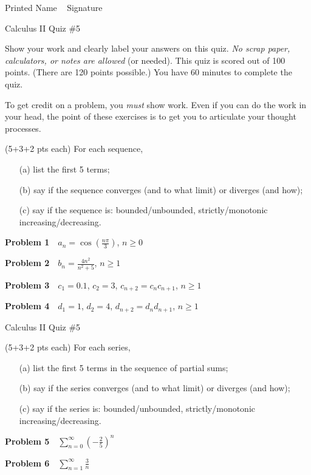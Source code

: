 \documentclass[10pt]{article}
\newcommand{\prob}[1]{\vspace{10mm} \noindent \textbf{Problem #1} \,\,}
\newcommand{\header}{
\begin{center}
Calculus II Quiz \#5
\end{center}

\vspace{2mm}

}
\newcommand{\namefield}{
\noindent Printed Name \underline{\hspace{50mm}} \,\,\, Signature \underline{\hspace{50mm}}
}
\newcommand{\inst}[2]{
Show your work and clearly label your answers on this quiz. \emph{No scrap paper, calculators, or notes are allowed} (or needed). This quiz is scored out of #1 points. (There are #2 points possible.) You have 60 minutes to complete the quiz.

To get credit on a problem, you \emph{must} show work. Even if you can do the work in your head, the point of these exercises is to get you to articulate your thought processes.
}
\begin{document}


\namefield

\header

\inst{100}{120}


(5+3+2 pts each) For each sequence, 
\begin{itemize}
\item[(a) ] list the first 5 terms;
\item[(b) ] say if the sequence converges (and to what limit) or diverges (and how);
\item[(c) ] say if the sequence is: bounded/unbounded, strictly/monotonic increasing/decreasing.
\end{itemize}

\prob{1} $a_n = \cos(\frac{n \pi}{3})$, $n \geq 0$

\vspace{30mm}

\prob{2} $b_n = \frac{4 n^2}{n^2 + 5}$, $n \geq 1$

\vspace{30mm}

\prob{3} $c_1 = 0.1$, $c_2 = 3$, $c_{n+2} = c_n c_{n+1}$, $n \geq 1$

\vspace{30mm}

\prob{4} $d_1 = 1$, $d_2 = 4$, $d_{n+2} = d_n d_{n+1}$, $n \geq 1$

\pagebreak

\header

(5+3+2 pts each) For each series, 
\begin{itemize}
\item[(a) ] list the first 5 terms in the sequence of partial sums;
\item[(b) ] say if the series converges (and to what limit) or diverges (and how);
\item[(c) ] say if the series is: bounded/unbounded, strictly/monotonic increasing/decreasing.
\end{itemize}

\prob{5} $\sum\limits_{n = 0}^{\infty} \left( -\frac{2}{5} \right)^n$

\vspace{25mm}

\prob{6} $\sum\limits_{n = 1}^{\infty} \frac{3}{n}$

\vspace{25mm}
\end{document}
